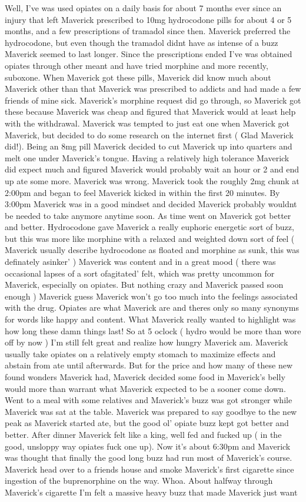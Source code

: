 \documentclass[12pt]{book}
\begin{document}
Well, I've was used opiates on a daily basis for about 7 months ever since an injury that left Maverick prescribed to 10mg hydrocodone pills for about 4 or 5 months, and a few prescriptions of tramadol since then. Maverick preferred the hydrocodone, but even though the tramadol didnt have as intense of a buzz Maverick seemed to last longer. Since the prescriptions ended I've was obtained opiates through other meant and have tried morphine and more recently, suboxone. When Maverick got these pills, Maverick did know much about Maverick other than that Maverick was prescribed to addicts and had made a few friends of mine sick. Maverick's morphine request did go through, so Maverick got these because Maverick was cheap and figured that Maverick would at least help with the withdrawal. Maverick was tempted to just eat one when Maverick got Maverick, but decided to do some research on the internet first ( Glad Maverick did!). Being an 8mg pill Maverick decided to cut Maverick up into quarters and melt one under Maverick's tongue. Having a relatively high tolerance Maverick did expect much and figured Maverick would probably wait an hour or 2 and end up ate some more. Maverick was wrong. Maverick took the roughly 2mg chunk at 2:00pm and began to feel Maverick kicked in within the first 20 minutes. By 3:00pm Maverick was in a good mindset and decided Maverick probably wouldnt be needed to take anymore anytime soon. As time went on Maverick got better and better. Hydrocodone gave Maverick a really euphoric energetic sort of buzz, but this was more like morphine with a relaxed and weighted down sort of feel ( Maverick usually describe hydrocodone as floated and morphine as sunk, this was definately asinker' ) Maverick was content and in a great mood ( there was occasional lapses of a sort ofagitated' felt, which was pretty uncommon for Maverick, especially on opiates. But nothing crazy and Maverick passed soon enough ) Maverick guess Maverick won't go too much into the feelings associated with the drug. Opiates are what Maverick are and theres only so many synonyms for words like happy and content. What Maverick really wanted to highlight was how long these damn things last! So at 5 oclock ( hydro would be more than wore off by now ) I'm still felt great and realize how hungry Maverick am. Maverick usually take opiates on a relatively empty stomach to maximize effects and abstain from ate until afterwards. But for the price and how many of these new found wonders Maverick had, Maverick decided some food in Maverick's belly would more than warrant what Maverick expected to be a sooner come down. Went to a meal with some relatives and Maverick's buzz was got stronger while Maverick was sat at the table. Maverick was prepared to say goodbye to the new peak as Maverick started ate, but the good ol' opiate buzz kept got better and better. After dinner Maverick felt like a king, well fed and fucked up ( in the good, unsloppy way opiates fuck one up). Now it's about 6:30pm and Maverick was thought that finally the good long buzz had run most of Maverick's course. Maverick head over to a friends house and smoke Maverick's first cigarette since ingestion of the buprenorphine on the way. Whoa. About halfway through Maverick's cigarette I'm felt a massive heavy buzz that made Maverick just want 
\end{document}
